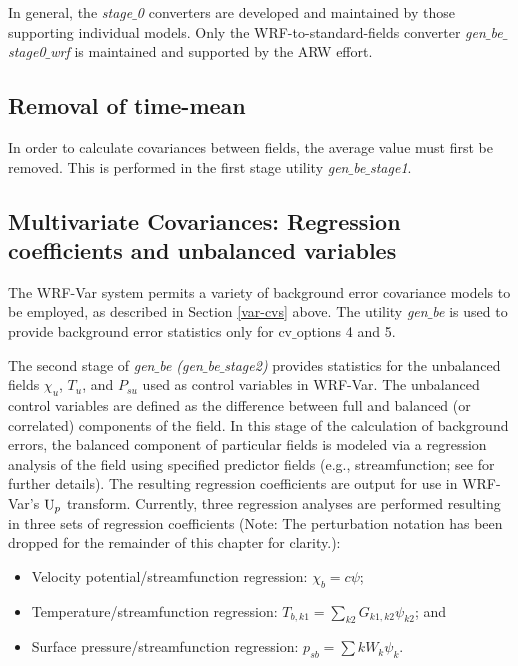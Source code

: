 In general, the {\it stage$\_$0} converters are developed and maintained by those supporting
individual models. Only the WRF-to-standard-fields converter {\it gen$\_$be$\_$stage0$\_$wrf} 
is maintained and supported by the ARW effort.

\subsection{Removal of time-mean}

In order to calculate covariances between fields, the average value must first be removed. 
This is performed in the first stage utility {\it gen$\_$be$\_$stage1}. 

\subsection{Multivariate Covariances: Regression coefficients and unbalanced variables}

The WRF-Var system permits a variety of background error covariance
models to be employed, as described in Section \ref{var-cvs}
above. 
The utility {\it gen$\_$be} is used to provide background error
statistics only for cv$\_$options 4 and 5.  

The second stage
of {\it gen$\_$be (gen$\_$be$\_$stage2)} provides statistics for the
unbalanced fields $\chi_u$, $T_u$, and $P_{su}$ used as control
variables in WRF-Var. The unbalanced control variables are defined as
the difference between full and balanced (or correlated) components of
the field. In this stage of the calculation of background errors, the
balanced component of particular fields is modeled via a regression
analysis of the field using specified predictor fields
(e.g., streamfunction; see
\citet{wu02} for further details). The resulting regression coefficients 
are output for use 
in WRF-Var's ${\rm U}_p$ transform. Currently, three regression analyses are
performed resulting in three sets of regression coefficients (Note:
The perturbation notation has been dropped for the 
remainder of this chapter for clarity.):

\begin{itemize}\setlength{\parskip}{-4pt}
\item   Velocity potential/streamfunction regression: $\chi_b=c\psi$;
\item	Temperature/streamfunction regression: $T_{b,k1}=\sum_{k2}G_{k1,k2}\psi_{k2}$; and
\item	Surface pressure/streamfunction regression: $p_{sb}=\sum{k}W_{k}\psi_{k}$.
\end{itemize}

